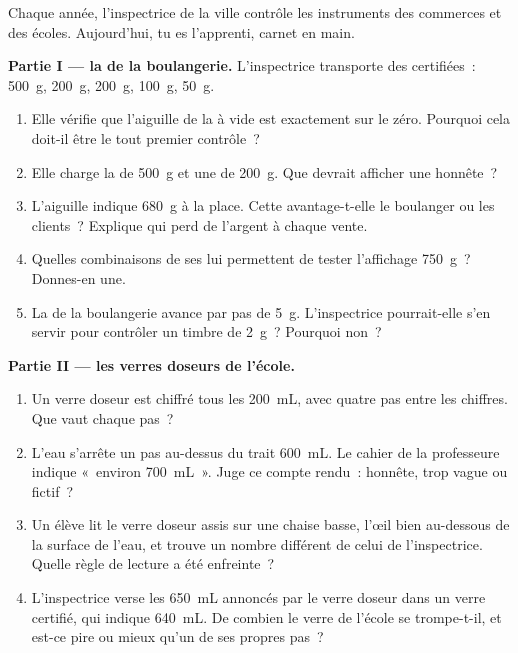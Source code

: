 \begin{problem}\label{pb:g6:measurement-in-science:1}
Chaque année, l'inspectrice de la ville contrôle les instruments des
commerces et des écoles. Aujourd'hui, tu es l'apprenti, carnet en
main.

\medskip\noindent\textbf{Partie I --- la  de la boulangerie.}
L'inspectrice transporte des  certifiées~: \qty{500}{g},
\qty{200}{g}, \qty{200}{g}, \qty{100}{g}, \qty{50}{g}.
\begin{enumerate}
  \item Elle vérifie que l'aiguille de la  à vide est
        exactement sur le zéro. Pourquoi cela doit-il être le tout
        premier contrôle~?
  \item Elle charge la  de \qty{500}{g} et une de
        \qty{200}{g}. Que devrait afficher une  honnête~?
  \item L'aiguille indique \qty{680}{g} à la place. Cette 
        avantage-t-elle le boulanger ou les clients~? Explique qui
        perd de l'argent à chaque vente.
  \item Quelles combinaisons de ses  lui permettent de tester
        l'affichage \qty{750}{g}~? Donnes-en une.
  \item La  de la boulangerie avance par pas de \qty{5}{g}.
        L'inspectrice pourrait-elle s'en servir pour contrôler un
        timbre de \qty{2}{g}~? Pourquoi non~?
\end{enumerate}

\medskip\noindent\textbf{Partie II --- les verres doseurs de
l'école.}
\begin{enumerate}[resume]
  \item Un verre doseur est chiffré tous les \qty{200}{mL}, avec
        quatre pas entre les chiffres. Que vaut chaque pas~?
  \item L'eau s'arrête un pas au-dessus du trait \qty{600}{mL}. Le
        cahier de la professeure indique «~environ
        \qty{700}{mL}~». Juge ce compte rendu~: honnête, trop vague
        ou fictif~?
  \item Un élève lit le verre doseur assis sur une chaise basse,
        l'œil bien au-dessous de la surface de l'eau, et trouve un
        nombre différent de celui de l'inspectrice. Quelle règle de
        lecture a été enfreinte~?
  \item L'inspectrice verse les \qty{650}{mL} annoncés par le verre
        doseur dans un verre certifié, qui indique \qty{640}{mL}. De
        combien le verre de l'école se trompe-t-il, et est-ce pire
        ou mieux qu'un de ses propres pas~?
\end{enumerate}


\end{problem}
